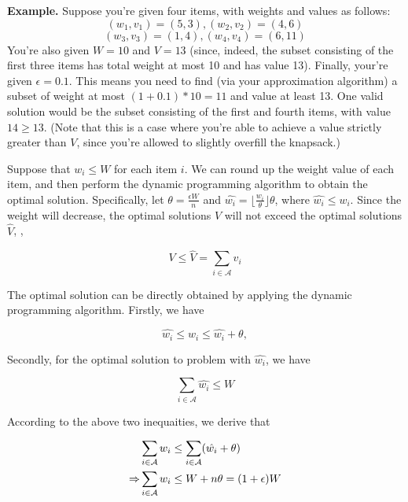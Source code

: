 \begin{problem}
    \textbf{Example.} Suppose you're given four items, with weights and values as follows:
    \begin{equation}\nonumber
      (w_1,v_1) = (5,3), (w_2, v_2) = (4,6)
    \end{equation}
    \begin{equation}\nonumber
      (w_3,v_3) = (1,4), (w_4, v_4) = (6,11)
    \end{equation}
    You're also given $W=10$ and $V=13$ (since, indeed, the subset consisting of the first three items has total weight at most 10 and has value 13). Finally, your're given $\epsilon=0.1$. This means you need to find (via your approximation algorithm) a subset of weight at most $(1+0.1)*10 = 11$ and value at least 13. One valid solution would be the subset consisting of the first and fourth items, with value $14\geq13$. (Note that this is a case where you're able to achieve a value strictly greater than $V$, since you're allowed to slightly overfill the knapsack.)
    
    \Answer
    Suppose that $w_i\leq W$ for each item $i$. We can round up the weight value of each item, and then perform the dynamic programming algorithm to obtain the optimal solution. Specifically, let $\theta = \frac{\epsilon W}{n}$
    and $\hat{w_i} = \lfloor\frac{w_i}{\theta}\rfloor\theta$, where $\hat{w_i}\leq w_i$. Since the weight will decrease, the optimal solutions $V$ will not exceed the optimal solutions $\hat{V}$, \ie,
    
    \begin{equation}
      V\leq \hat{V}=\sum_{i\in\mathcal{A}}v_i
    \end{equation}
    
    The optimal solution can be directly obtained by applying the dynamic programming algorithm. Firstly, we have
    
    \begin{equation}
      \hat{w_i}\leq w_i\leq \hat{w_i}+\theta,
    \end{equation}
    
    Secondly, for the optimal solution to problem with $\hat{w_i}$, we have
    
    \begin{equation}
      \sum_{i\in\mathcal{A}}\hat{w_i}\leq W
    \end{equation}
    
    According to the above two inequaities, we derive that
    
    \begin{align}
      & \notag \sum_{i\in\mathcal{A}}w_i\leq\sum_{i\in\mathcal{A}}(\hat{w_i}+\theta)\\
      \Rightarrow & \sum_{i\in\mathcal{A}}w_i\leq W+ n\theta = (1+\epsilon)W
    \end{align}
  \end{problem}


